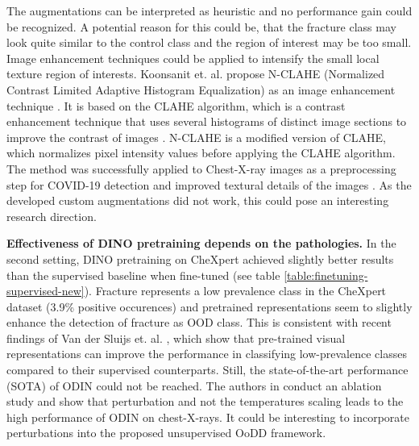 The augmentations can be interpreted as heuristic and no performance gain could be recognized.
A potential reason for this could be, that the fracture class may look quite similar to the control class and the region of interest may be too small. 
Image enhancement techniques could be applied to intensify the small local texture region of interests.
Koonsanit et. al. propose N-CLAHE (Normalized Contrast Limited Adaptive Histogram Equalization) as an image enhancement technique \citep{Koonsanit2017}.
It is based on the CLAHE algorithm, which is a contrast enhancement technique that uses several histograms of distinct image sections to improve the contrast of images \citep{Zuiderveld1994}.
N-CLAHE is a modified version of CLAHE, which normalizes pixel intensity values before applying the CLAHE algorithm.
The method was successfully applied to Chest-X-ray images as a preprocessing step for COVID-19 detection and improved textural details of the images \citep{Horry2020}.
As the developed custom augmentations did not work, this could pose an interesting research direction.
\par
\textbf{Effectiveness of DINO pretraining depends on the pathologies.} 
In the second setting, DINO pretraining on CheXpert achieved slightly better results than the supervised baseline when fine-tuned (see table \ref{table:finetuning-supervised-new}).
Fracture represents a low prevalence class in the CheXpert dataset (3.9\% positive occurences) and pretrained representations seem to slightly enhance the detection of fracture as OOD class.
This is consistent with recent findings of Van der Sluijs et. al. \citep{Vandersluijs2023}, which show that pre-trained visual representations can improve the performance in classifying low-prevalence classes compared to their supervised counterparts.
Still, the state-of-the-art performance (SOTA) of ODIN could not be reached.
The authors in \citep{Berger2021} conduct an ablation study and show that perturbation and not the temperatures scaling leads to the high performance of ODIN on chest-X-rays.
It could be interesting to incorporate perturbations into the proposed unsupervised OoDD framework.
